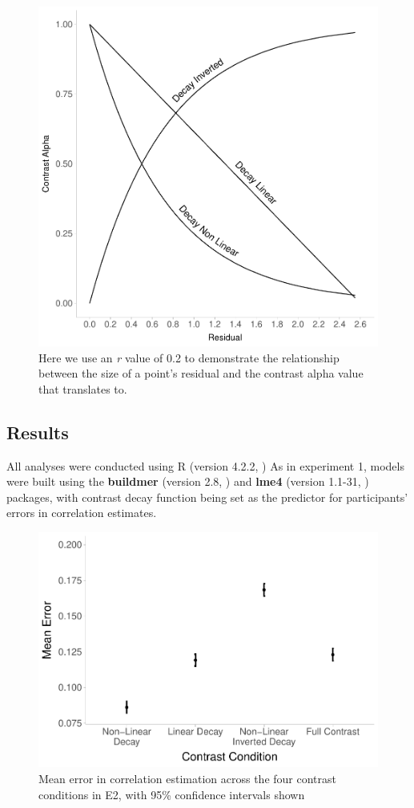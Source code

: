 \documentclass[preprint, 3p,
authoryear]{elsarticle} %
\begin{document}
\begin{figure}

\includegraphics[width=0.5\linewidth]{contrast_and_scatterplots_files/figure-latex/decay-parameters-1} \hfill{}

\caption{\label{decay-parameters}Here we use an \textit{r} value of 0.2 to demonstrate the relationship between the size of a point's residual and the contrast alpha value that translates to.}\label{fig:decay-parameters}
\end{figure}

\hypertarget{results-1}{%
\subsection{Results}\label{results-1}}

All analyses were conducted using R (version 4.2.2, \citealp{r_core}) As
in experiment 1, models were built using the \textbf{buildmer} (version
2.8, \citealp{voeten_buildmer_2022}) and \textbf{lme4} (version 1.1-31,
\citealp{bates_lme4_2015}) packages, with contrast decay function being
set as the predictor for participants' errors in correlation estimates.

\begin{figure}

\includegraphics[width=0.5\linewidth]{contrast_and_scatterplots_files/figure-latex/e2-dot-plot-1} \hfill{}

\caption{\label{e2-dot-plot}Mean error in correlation estimation across the four contrast conditions in E2, with 95\% confidence intervals shown}\label{fig:e2-dot-plot}
\end{figure}
\end{document}
